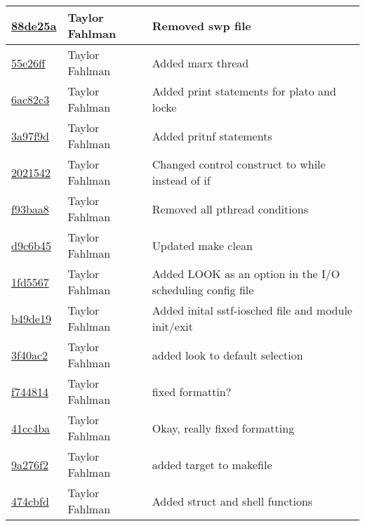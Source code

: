 \begin{tabular}{l l l}
\href{https://github.com/fahlmant/cs444/commit/88de25a62a2e699650bc207419b2b384abc5a748}{88de25a} & Taylor Fahlman & Removed swp file\\\hline
\href{https://github.com/fahlmant/cs444/commit/55e26ff34cc7fc3159c10da1add5024754667dbd}{55e26ff} & Taylor Fahlman & Added marx thread\\\hline
\href{https://github.com/fahlmant/cs444/commit/6ac82c37f00e5ac3d70cc9fce0cdd69a4b09a1c0}{6ac82c3} & Taylor Fahlman & Added print statements for plato and locke\\\hline
\href{https://github.com/fahlmant/cs444/commit/3a97f9ddf3e62cf13f868b6554fa48b76e200e64}{3a97f9d} & Taylor Fahlman & Added pritnf statements\\\hline
\href{https://github.com/fahlmant/cs444/commit/2021542aebdf6ed1edee48fec117909c7b9926da}{2021542} & Taylor Fahlman & Changed control construct to while instead of if\\\hline
\href{https://github.com/fahlmant/cs444/commit/f93baa8e24785744b1f3ae51ec64e45e62e6ea6e}{f93baa8} & Taylor Fahlman & Removed all pthread conditions\\\hline
\href{https://github.com/fahlmant/cs444/commit/d9c6b45e2f1eee4649ad42b115e750bd68d2622a}{d9c6b45} & Taylor Fahlman & Updated make clean\\\hline
\href{https://github.com/fahlmant/cs444/commit/1fd55679562034d28fcfbb6e2ac1642c5c88dfc9}{1fd5567} & Taylor Fahlman & Added LOOK as an option in the I/O scheduling config file\\\hline
\href{https://github.com/fahlmant/cs444/commit/b49de190dda284a50bb2738f40b8436171b9d691}{b49de19} & Taylor Fahlman & Added inital sstf-iosched file and module init/exit\\\hline
\href{https://github.com/fahlmant/cs444/commit/3f40ac2f576b2250e924524e3c7973a7b57b99dc}{3f40ac2} & Taylor Fahlman & added look to default selection\\\hline
\href{https://github.com/fahlmant/cs444/commit/f744814a5f73441d92f08e7ec4c1734b8effe233}{f744814} & Taylor Fahlman & fixed formattin?\\\hline
\href{https://github.com/fahlmant/cs444/commit/41cc4baab6306e573e7cebb13ab23eba9ee28942}{41cc4ba} & Taylor Fahlman & Okay, really fixed formatting\\\hline
\href{https://github.com/fahlmant/cs444/commit/9a276f27141dec3a008c5ff9b3f53302579d55dc}{9a276f2} & Taylor Fahlman & added target to makefile\\\hline
\href{https://github.com/fahlmant/cs444/commit/474cbfd6cf240364ec4739b91d21f0a08efa0507}{474cbfd} & Taylor Fahlman & Added struct and shell functions\\\hline

\end{tabular}
